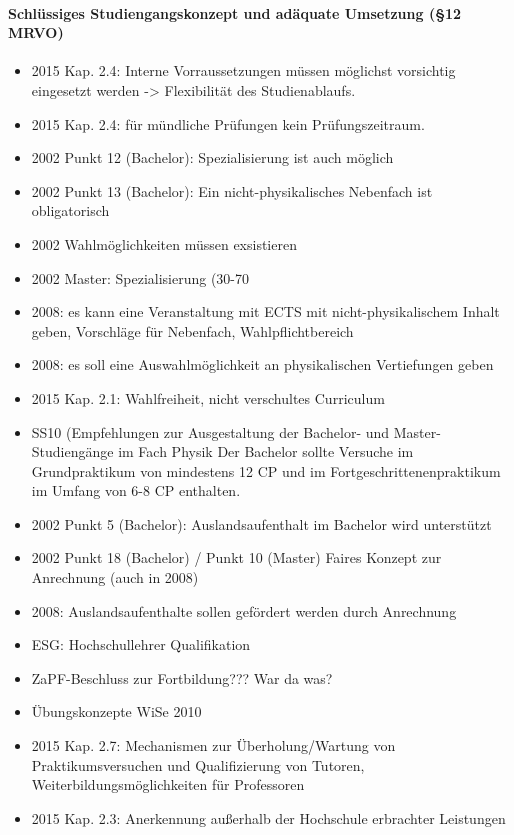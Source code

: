     \paragraph*{Schlüssiges Studiengangskonzept und adäquate Umsetzung (§12 MRVO)}
      \begin{itemize}
        \item 2015 Kap. 2.4: Interne Vorraussetzungen müssen möglichst vorsichtig eingesetzt werden -> Flexibilität des Studienablaufs.
        \item 2015 Kap. 2.4: für mündliche Prüfungen kein Prüfungszeitraum.
        \item 2002 Punkt 12 (Bachelor): Spezialisierung ist auch möglich
        \item 2002 Punkt 13 (Bachelor): Ein nicht-physikalisches Nebenfach ist obligatorisch
        \item 2002 Wahlmöglichkeiten müssen exsistieren
        \item 2002 Master: Spezialisierung (30-70 %
        \item 2008: es kann eine Veranstaltung mit ECTS mit nicht-physikalischem Inhalt geben, Vorschläge für Nebenfach, Wahlpflichtbereich
        \item 2008: es soll eine Auswahlmöglichkeit an physikalischen Vertiefungen geben
        \item 2015 Kap. 2.1: Wahlfreiheit, nicht verschultes Curriculum
        \item SS10 (Empfehlungen zur Ausgestaltung der Bachelor- und Master-Studiengänge im Fach Physik Der Bachelor sollte Versuche im Grundpraktikum von mindestens 12 CP und im Fortgeschrittenenpraktikum im Umfang von 6-8 CP enthalten.
        \item 2002 Punkt 5 (Bachelor): Auslandsaufenthalt im Bachelor wird unterstützt
        \item 2002 Punkt 18 (Bachelor) / Punkt 10 (Master) Faires Konzept zur Anrechnung (auch in 2008)
        \item 2008: Auslandsaufenthalte sollen gefördert werden durch Anrechnung
        \item ESG: Hochschullehrer Qualifikation
        \item ZaPF-Beschluss zur Fortbildung??? War da was?
        \item Übungskonzepte WiSe 2010
        \item 2015 Kap. 2.7: Mechanismen zur Überholung/Wartung von Praktikumsversuchen und Qualifizierung von Tutoren, Weiterbildungsmöglichkeiten für Professoren
        \item 2015 Kap. 2.3: Anerkennung außerhalb der Hochschule erbrachter Leistungen

\end{itemize}
